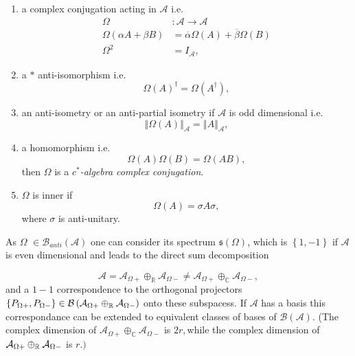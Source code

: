 \documentclass[aps,preprint]{revtex4}
\begin{document}
\begin{enumerate}
\item a complex conjugation acting in $\mathcal{A}$ i.e. 
\begin{align}
\Omega & :\mathcal{A}\longrightarrow\mathcal{A} \\
\Omega\left( \alpha A+\beta B\right) & =\overline{\alpha}\Omega\left(
A\right) +\overline{\beta}\Omega\left( B\right) \\
\Omega^{2} & =I_{\mathcal{A}},
\end{align}

\item a $\ast$ anti-isomorphism i.e. 
\begin{equation}
\Omega\left( A\right) ^{\dagger}=\Omega\left( A^{\dagger}\right) ,
\end{equation}

\item an anti-isometry or an anti-partial isometry if $\mathcal{A}$ is odd
dimensional i.e. 
\begin{equation}
\left\Vert \Omega\left( A\right) \right\Vert _{\mathcal{A}}=\left\Vert
A\right\Vert _{\mathcal{A}},
\end{equation}

\item a homomorphism i.e. 
\begin{equation}
\Omega\left( A\right) \Omega\left( B\right) =\Omega\left( AB\right) ,
\end{equation}
then $\Omega$ is a $c^{\ast}$\emph{-algebra complex conjugation}.

\item $\Omega$ is inner if 
\begin{equation}
\Omega\left( A\right) =\sigma A\sigma,
\end{equation}
where $\sigma$ is anti-unitary.
\end{enumerate}

As $\Omega$ $\in\mathcal{B}_{anti}\left( \mathcal{A}\right) $ one can
consider its spectrum $\mathfrak{s}\left( \Omega\right) $, which is $\left\{
1,-1\right\} $ if $\mathcal{A}$ is even dimensional and leads to the direct
sum decomposition

\begin{equation}
\mathcal{A}=\mathcal{A}_{\Omega+}\oplus_{\mathbb{R}}\mathcal{A}_{\Omega-}\neq%
\mathcal{A}_{\Omega+}\oplus_{\mathbb{C}}\mathcal{A}_{\Omega-},
\end{equation}
and a $1-1$ correspondence to the orthogonal projectors $\left\{ P_{\Omega
+},P_{\Omega-}\right\} \in\mathcal{B}\left( \mathcal{A}_{\Omega+}\oplus_{%
\mathbb{R}}\mathcal{A}_{\Omega-}\right) $ onto these subspacess. If $%
\mathcal{A}$ has a basis this correspondance can be extended to equivalent
classes of bases of $\mathcal{B}\left( \mathcal{A}\right) .$ (The complex
dimension of $\mathcal{A}_{\Omega+}\oplus_{\mathbb{C}}\mathcal{A}_{\Omega-}$
is $2r,$while the complex dimension of $\mathcal{A}_{\Omega+}\oplus _{%
\mathbb{R}}\mathcal{A}_{\Omega-}$ is $r.)$
\end{document}

